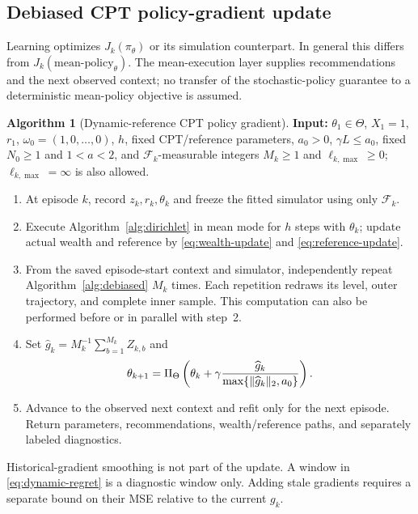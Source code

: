 \documentclass[11pt]{article}
\newcommand{\1}{\mathbf 1}
\DeclarePairedDelimiter{\norm}{\lVert}{\rVert}
\newcommand{\cF}{\mathcal F}
\theoremstyle{definition}
\newtheorem{algorithm}{Algorithm}
\begin{document}
\subsection{Debiased CPT policy-gradient update}
Learning optimizes $J_k(\pi_\theta)$ or its simulation counterpart. In general this differs from $J_k(\mathrm{mean\mbox{-}policy}_\theta)$. The mean-execution layer supplies recommendations and the next observed context; no transfer of the stochastic-policy guarantee to a deterministic mean-policy objective is assumed.

\begin{algorithm}[Dynamic-reference CPT policy gradient]\label{alg:drcptpg}
\normalfont
\textbf{Input:} $\theta_1\in\Theta$, $X_1=1$, $r_1$, $\omega_0=(1,0,\ldots,0)$, $h$, fixed CPT/reference parameters, $a_0>0$, $\gamma L\le a_0$, fixed $N_0\ge1$ and $1<a<2$, and $\cF_k$-measurable integers $M_k\ge1$ and $\ell_{k,\max}\ge0$; $\ell_{k,\max}=\infty$ is also allowed.
\begin{enumerate}
\item At episode $k$, record $z_k,r_k,\theta_k$ and freeze the fitted simulator using only $\cF_k$.
\item Execute Algorithm~\ref{alg:dirichlet} in mean mode for $h$ steps with $\theta_k$; update actual wealth and reference by \eqref{eq:wealth-update} and \eqref{eq:reference-update}.
\item From the saved episode-start context and simulator, independently repeat Algorithm~\ref{alg:debiased} $M_k$ times. Each repetition redraws its level, outer trajectory, and complete inner sample. This computation can also be performed before or in parallel with step~2.
\item Set $\widehat g_k=M_k^{-1}\sum_{b=1}^{M_k}Z_{k,b}$ and
\begin{equation}\label{eq:parameter-update}
 \theta_{k+1}=\Pi_\Theta\left(\theta_k+
 \gamma\frac{\widehat g_k}{\max\{\norm{\widehat g_k}_2,a_0\}}\right).
\end{equation}
\item Advance to the observed next context and refit only for the next episode. Return parameters, recommendations, wealth/reference paths, and separately labeled diagnostics.
\end{enumerate}
\end{algorithm}
Historical-gradient smoothing is not part of the update. A window in \eqref{eq:dynamic-regret} is a diagnostic window only. Adding stale gradients requires a separate bound on their MSE relative to the current $g_k$.
\end{document}
